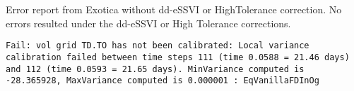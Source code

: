 \documentclass[11pt,letterpaper]{article}
\begin{document}

\begin{center}
Error report from Exotica without dd-eSSVI or HighTolerance correction. No errors resulted under the dd-eSSVI or High Tolerance corrections.

\texttt{Fail: vol grid TD.TO has not been calibrated: Local variance calibration failed between time steps 111 (time 0.0588 = 21.46 days) and 112 (time 0.0593 = 21.65 days). MinVariance computed is -28.365928, MaxVariance computed is 0.000001 : EqVanillaFDInOg }
\end{center}



\newpage
\end{document}
